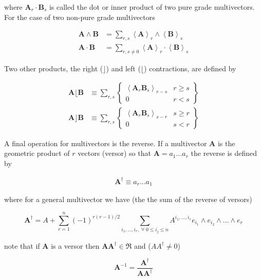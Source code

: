 \documentclass[10pt]{article}
\newcommand{\bfrac}[2]{\displaystyle\frac{#1}{#2}}
\newcommand{\llt}{\left <}
\newcommand{\rgt}{\right >}
\newcommand{\W}{\wedge}
\newcommand{\R}{\dagger}
\newcommand{\proj}[2]{\llt {#1} \rgt_{#2}}
\newcommand{\braces}[1]{\left \{ {#1} \right \}}
\begin{document}
where $\bm{A}_{r}\cdot\bm{B}_{s}$ is called the dot or inner product of
two pure grade multivectors.  For the case of two non-pure grade multivectors

   \begin{align}
      \bm{A}\W\bm{B} &= \sum_{r,s}\proj{\bm{A}}{r}\W\proj{\bm{B}}{{s}} \\
      \bm{A}\cdot\bm{B} &= \sum_{r,s\ne 0}\proj{\bm{A}}{r}\cdot\proj{\bm{B}}{{s}}
   \end{align}

Two other products, the right ($\rfloor$) and left ($\lfloor$) contractions, are defined by

   \begin{align}
      \bm{A}\lfloor\bm{B} &\equiv \sum_{r,s}\braces{\begin{array}{cc} \proj{\bm{A}_r\bm{B}_{s}}{r-s} & r \ge s \\
                                                  0                                               & r < s \end{array}}  \\
      \bm{A}\rfloor\bm{B} &\equiv \sum_{r,s}\braces{\begin{array}{cc} \proj{\bm{A}_{r}\bm{B}_{s}}{s-r} & s \ge r \\
                                                  0                                               & s < r\end{array}}
   \end{align}

A final operation for multivectors is the reverse.  If a multivector $\bm{A}$ is the geometric product of $r$ vectors (versor)
so that $\bm{A} = a_{1}\dots a_{r}$ the reverse is defined by

   \begin{align}
      \bm{A}^{\R} \equiv a_{r}\dots a_{1}
   \end{align}

where for a general multivector we have (the the sum of the reverse of versors)

   \begin{equation}
      \bm{A}^{\R} = A + \sum_{r=1}^{n}(-1)^{r(r-1)/2}\sum_{i_{1},\dots,i_{r},\;\forall\; 0\le i_{j} \le n} A^{i_{1},\dots,i_{r}}e_{i_{1}}\W e_{i_{2}}\W\dots\W e_{r}
   \end{equation}

note that if $\bm{A}$ is a versor then $\bm{A}\bm{A}^{\R}\in\Re$ and ($AA^{\R} \ne 0$)

   \begin{equation}
      \bm{A}^{-1} = \bfrac{\bm{A}^{\R}}{\bm{AA}^{\R}}
   \end{equation}
\end{document}
